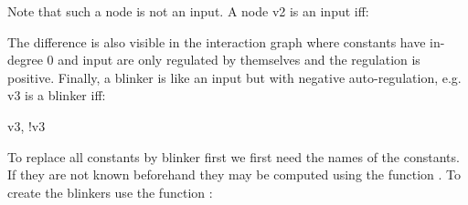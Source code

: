 \documentclass[letterpaper,10pt,english]{sphinxmanual}
\begin{document}
\begin{sphinxVerbatim}[commandchars=\\\{\}]
   
\end{sphinxVerbatim}

Note that such a node is not an input. A node v2 is an input iff:

\begin{sphinxVerbatim}[commandchars=\\\{\}]
   
\end{sphinxVerbatim}

The difference is also visible in the interaction graph where constants have in-degree 0 and input are only regulated by themselves and the regulation is positive.
Finally, a blinker is like an input but with negative auto-regulation, e.g. v3 is a blinker iff:

\begin{sphinxVerbatim}[commandchars=\\\{\}]
v3,   !v3
\end{sphinxVerbatim}

To replace all constants by blinker first we first need the names of the constants.
If they are not known beforehand they may be computed using the function {\hyperref[\detokenize{PrimeImplicants:find-constants}]{}}.
To create the blinkers use the function {\hyperref[\detokenize{PrimeImplicants:create-blinkers}]{}}:

\begin{sphinxVerbatim}[commandchars=\\\{\}]
     
  

  
  
 
\end{sphinxVerbatim}
\end{document}
